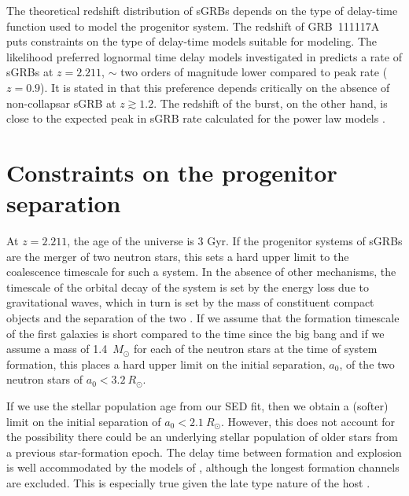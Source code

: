 \documentclass{aa}    %
\newcommand\todo[1]{\textbf{(#1)}}
\begin{document}
The theoretical redshift distribution of sGRBs depends on the type of delay-time
function used to model the progenitor system. The redshift of GRB~111117A puts
constraints on the type of delay-time models suitable for modeling. The
likelihood preferred lognormal time delay models investigated in
\citet{Wanderman2015} predicts a rate of sGRBs at $z = 2.211$, $\sim$ two orders
of magnitude lower compared to peak rate ($z = 0.9$). It is stated in
\citet{Wanderman2015} that this preference depends critically on the absence of
non-collapsar sGRB at $z \gtrsim 1.2$. The redshift of the burst, on the other
hand, is close to the expected peak in sGRB rate calculated for the power law
models \citep{Behroozi2014, Wanderman2015}. 




\section{Constraints on the progenitor separation}

At $z = 2.211$, the age of the universe is 3 Gyr. If the progenitor systems of
sGRBs are the merger of two neutron stars, this sets a hard upper limit to the
coalescence timescale for such a system. In the absence of other mechanisms, the
timescale of the orbital decay of the system is set by the energy loss due to
gravitational waves, which in turn is set by the mass of constituent compact
objects and the separation of the two \citep{Postnov2014}. If we assume that the
formation timescale of the first galaxies is short compared to the time since
the big bang \citep{Richard2011} and if we assume a mass of 1.4~$M_\odot$ for
each of the neutron stars at the time of system formation, this places a hard
upper limit on the initial separation, $a_0$, of the two neutron stars of $a_0 <
3.2~R_\odot$.

If we use the stellar population age from our SED fit, then we obtain a
(softer) limit on the initial separation of $a_0 < 2.1~R_\odot$. However, this
does not account for the possibility there could be an underlying stellar
population of older stars from a previous star-formation epoch. The delay time
between formation and explosion is well accommodated by the models of
\citet{Belczynski2006}, although the longest formation channels are excluded.
This is especially true given the late type nature of the host
\citep{OShaughnessy2008}.
\end{document}
